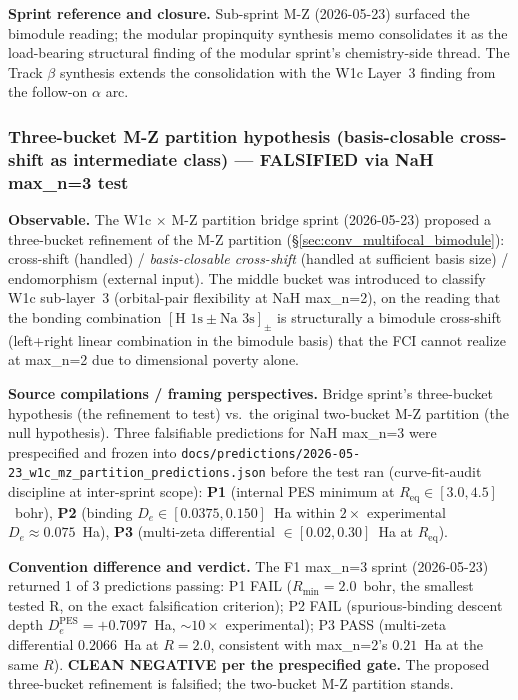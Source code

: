 \documentclass[11pt]{article}
\begin{document}
\textbf{Sprint reference and closure.}
Sub-sprint M-Z (2026-05-23) surfaced the bimodule reading; the modular propinquity
synthesis memo
consolidates it as the load-bearing structural finding of the
modular sprint's chemistry-side thread.  The Track $\beta$ synthesis
extends the consolidation with the W1c Layer~3 finding from the
follow-on $\alpha$ arc.

\subsubsection{Three-bucket M-Z partition hypothesis (basis-closable
cross-shift as intermediate class) --- FALSIFIED via NaH max\_n=3 test}
\label{sec:conv_three_bucket_falsified}

\textbf{Observable.} The W1c $\times$ M-Z partition bridge sprint
(2026-05-23)
proposed a three-bucket refinement of the M-Z partition
(\S\ref{sec:conv_multifocal_bimodule}): cross-shift (handled) /
\emph{basis-closable cross-shift} (handled at sufficient basis size) /
endomorphism (external input). The middle bucket was introduced to
classify W1c sub-layer~3 (orbital-pair flexibility at NaH max\_n=2),
on the reading that the bonding combination $[\text{H 1s} \pm
\text{Na 3s}]_\pm$ is structurally a bimodule cross-shift (left+right
linear combination in the bimodule basis) that the FCI cannot realize
at max\_n=2 due to dimensional poverty alone.

\textbf{Source compilations / framing perspectives.} Bridge sprint's
three-bucket hypothesis (the refinement to test) vs.\ the
original two-bucket M-Z partition (the null hypothesis). Three
falsifiable predictions for NaH max\_n=3 were prespecified and frozen
into \texttt{docs/predictions/2026-05-23\_w1c\_mz\_partition\_predictions.json}
before the test ran (curve-fit-audit discipline at inter-sprint scope):
\textbf{P1} (internal PES minimum at $R_\text{eq} \in [3.0, 4.5]$~bohr),
\textbf{P2} (binding $D_e \in [0.0375, 0.150]$~Ha within $2\times$
experimental $D_e \approx 0.075$~Ha), \textbf{P3} (multi-zeta differential
$\in [0.02, 0.30]$~Ha at $R_\text{eq}$).

\textbf{Convention difference and verdict.} The F1 max\_n=3 sprint
(2026-05-23)
returned 1 of 3 predictions passing: P1 FAIL ($R_\text{min} = 2.0$~bohr,
the smallest tested R, on the exact falsification criterion); P2 FAIL
(spurious-binding descent depth $D_e^\text{PES} = +0.7097$~Ha, $\sim 10\times$
experimental); P3 PASS (multi-zeta differential $0.2066$~Ha at $R = 2.0$,
consistent with max\_n=2's $0.21$~Ha at the same $R$). \textbf{CLEAN
NEGATIVE per the prespecified gate.} The proposed three-bucket
refinement is falsified; the two-bucket M-Z partition stands.
\end{document}
